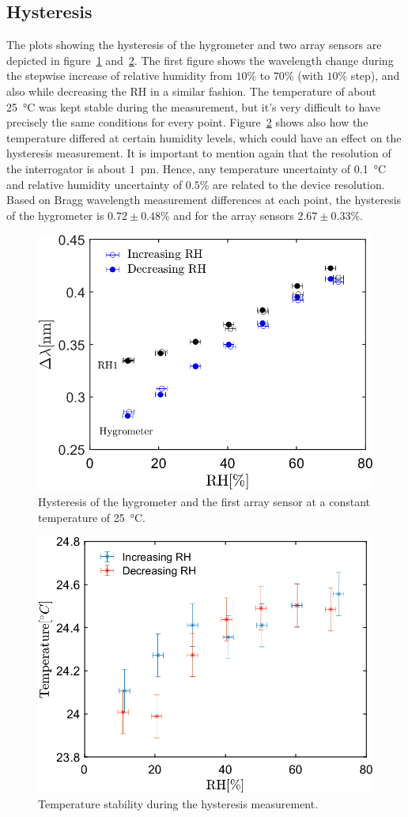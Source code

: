 \subsection{Hysteresis}
The plots showing the hysteresis of the hygrometer and two array sensors are depicted in figure~\ref{fig_hysteresis} and~\ref{fig_hysteresis2}. The first figure shows the wavelength change during the stepwise increase of relative humidity from $10$\% to $70$\% (with $10$\% step), and also while decreasing the \gls{RH} in a similar fashion. The temperature of about \SI{25}{\celsius} was kept stable during the measurement, but it's very difficult to have precisely the same conditions for every point.  Figure~\ref{fig_hysteresis2} shows also how the temperature differed at certain humidity levels, which could have an effect on the hysteresis measurement. It is important to mention again that the resolution of the interrogator is about $1$~pm. Hence, any temperature uncertainty of \SI{0.1}{\celsius} and relative humidity uncertainty of $0.5$\% are related to the device resolution. Based on Bragg wavelength measurement differences at each point, the hysteresis of the hygrometer is $0.72\pm0.48$\% and for the array sensors $2.67\pm0.33$\%. 

\begin{figure}[!h]
\centering
\includegraphics[width=0.6\columnwidth]{Chapter5/images/25_RHS.png}
\caption{Hysteresis of the hygrometer and the first array sensor at a constant temperature of \SI{25}{\celsius}.}
\label{fig_hysteresis}
\end{figure}

\begin{figure}[!h]
\centering
\includegraphics[width=0.6\columnwidth]{Chapter5/images/25_RHST.png}
\caption{Temperature stability during the hysteresis measurement.}
\label{fig_hysteresis2}
\end{figure}


